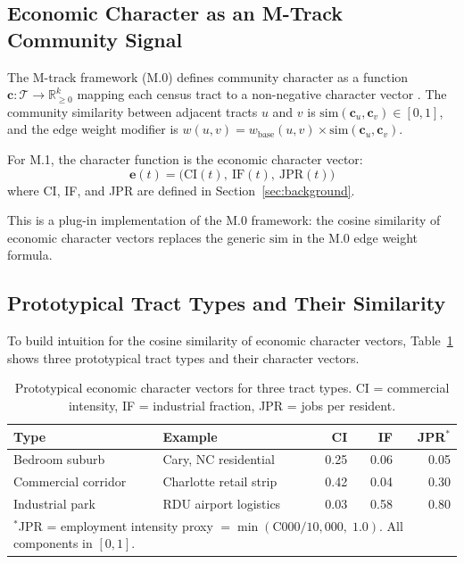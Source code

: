 \label{sec:framework}

\subsection{Economic Character as an M-Track Community Signal}

The M-track framework (M.0) defines community character as a function
$\mathbf{c}: \mathcal{T} \to \mathbb{R}^k_{\geq 0}$ mapping each census
tract to a non-negative character vector \citep{m0framework}.
The community similarity between adjacent tracts $u$ and $v$ is
$\mathrm{sim}(\mathbf{c}_u, \mathbf{c}_v) \in [0, 1]$, and the edge weight
modifier is $w(u,v) = w_{\mathrm{base}}(u,v) \times \mathrm{sim}(\mathbf{c}_u, \mathbf{c}_v)$.

For M.1, the character function is the economic character vector:
\begin{equation}
  \mathbf{e}(t) = \bigl(\mathrm{CI}(t),\ \mathrm{IF}(t),\ \mathrm{JPR}(t)\bigr)
  \label{eq:econchar}
\end{equation}
where CI, IF, and JPR are defined in Section~\ref{sec:background}.

This is a plug-in implementation of the M.0 framework: the cosine similarity
of economic character vectors replaces the generic $\mathrm{sim}$ in the
M.0 edge weight formula.

\subsection{Prototypical Tract Types and Their Similarity}

To build intuition for the cosine similarity of economic character vectors,
Table~\ref{tab:prototypes} shows three prototypical tract types and
their character vectors.

\begin{table}[ht]
\centering
\caption{Prototypical economic character vectors for three tract types.
  CI = commercial intensity, IF = industrial fraction, JPR = jobs per resident.}
\label{tab:prototypes}
\begin{tabular}{llrrr}
\toprule
Type & Example & CI & IF & JPR$^*$ \\
\midrule
Bedroom suburb & Cary, NC residential & 0.25 & 0.06 & 0.05 \\
Commercial corridor & Charlotte retail strip & 0.42 & 0.04 & 0.30 \\
Industrial park & RDU airport logistics & 0.03 & 0.58 & 0.80 \\
\multicolumn{5}{l}{\small $^*$JPR = employment intensity proxy $= \min(\mathrm{C000}/10{,}000,\; 1.0)$. All components in $[0,1]$.} \\
\bottomrule
\end{tabular}
\end{table}

